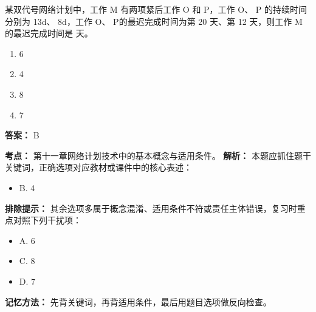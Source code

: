 \documentclass[UTF8,fontset=fandol,11pt]{ctexart}
\begin{document}
\begin{quizbox}[title={第 9 题}]
某双代号网络计划中，工作 M 有两项紧后工作 O 和 P，工作 O、 P 的持续时间分别为 13d、 8d，工作 O、 P的最迟完成时间为第 20 天、第 12 天，则工作 M 的最迟完成时间是 天。\\
\begin{enumerate}[label=\Alph*.]
\item 6
\item 4
\item 8
\item 7
\end{enumerate}
\textbf{答案：} B
\vspace{0.25em}
\begin{answerbox}[title={考点解析}]
\textbf{考点：} 第十一章网络计划技术中的基本概念与适用条件。
\textbf{解析：} 本题应抓住题干关键词，正确选项对应教材或课件中的核心表述：
\begin{itemize}
\item B. 4
\end{itemize}
\textbf{排除提示：} 其余选项多属于概念混淆、适用条件不符或责任主体错误，复习时重点对照下列干扰项：
\begin{itemize}
\item A. 6
\item C. 8
\item D. 7
\end{itemize}
\textbf{记忆方法：} 先背关键词，再背适用条件，最后用题目选项做反向检查。
\end{answerbox}
\end{quizbox}

\vspace{0.2em}
\end{document}
